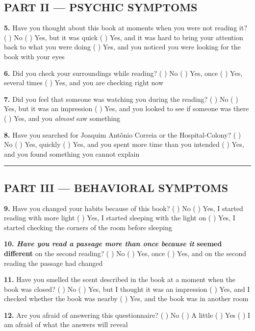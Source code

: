 \subsection*{PART II --- PSYCHIC SYMPTOMS}

\noindent \textbf{5.} Have you thought about this book at moments when you were not reading it?
( ) No
( ) Yes, but it was quick
( ) Yes, and it was hard to bring your attention back to what you were doing
( ) Yes, and you noticed you were looking for the book with your eyes

\noindent \textbf{6.} Did you check your surroundings while reading?
( ) No
( ) Yes, once
( ) Yes, several times
( ) Yes, and you are checking right now

\noindent \textbf{7.} Did you feel that someone was watching you during the reading?
( ) No
( ) Yes, but it was an impression
( ) Yes, and you looked to see if someone was there
( ) Yes, and you \textit{almost} saw something

\noindent \textbf{8.} Have you searched for Joaquim Antônio Correia or the Hospital-Colony?
( ) No
( ) Yes, quickly
( ) Yes, and you spent more time than you intended
( ) Yes, and you found something you cannot explain

\vspace{0.5em}\noindent\rule{\textwidth}{0.5pt}\vspace{0.5em}

\subsection*{PART III --- BEHAVIORAL SYMPTOMS}

\noindent \textbf{9.} Have you changed your habits because of this book?
( ) No
( ) Yes, I started reading with more light
( ) Yes, I started sleeping with the light on
( ) Yes, I started checking the corners of the room before sleeping

\noindent \textbf{10.\textit{ Have you read a passage more than once because it }seemed different} on the second reading?
( ) No
( ) Yes, once
( ) Yes, and on the second reading the passage had changed

\noindent \textbf{11.} Have you smelled the scent described in the book at a moment when the book was closed?
( ) No
( ) Yes, but I thought it was an impression
( ) Yes, and I checked whether the book was nearby
( ) Yes, and the book was in another room

\noindent \textbf{12.} Are you afraid of answering this questionnaire?
( ) No
( ) A little
( ) Yes
( ) I am afraid of what the answers will reveal

